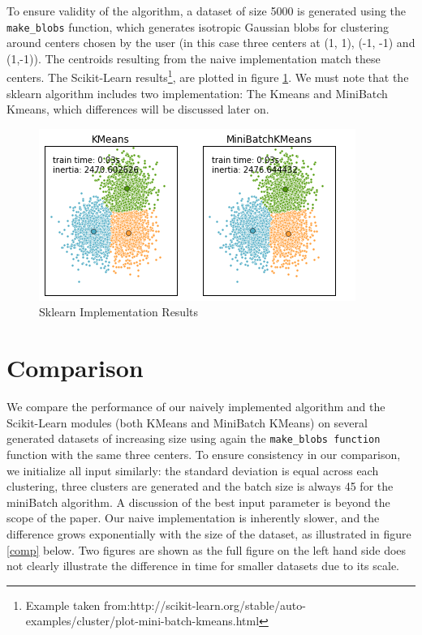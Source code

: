 \documentclass[11pt]{article}
\begin{document}
\noindent To ensure validity of the algorithm, a dataset of size 5000 is generated using the \verb|make_blobs| function, which generates isotropic Gaussian blobs for clustering around centers chosen by the user (in this case three centers at (1, 1), (-1, -1) and (1,-1)). The centroids resulting from the naive implementation match these centers.
The Scikit-Learn results\footnote{Example taken from:http://scikit-learn.org/stable/auto-examples/cluster/plot-mini-batch-kmeans.html}, are plotted in figure \ref{results}. We must note that the sklearn algorithm includes two implementation: The Kmeans and MiniBatch Kmeans, which differences will be discussed later on.

	\begin{figure}[ht!] 
		\centering
		\includegraphics[scale=0.8]{Figures/kmeans.png}
		\caption{Sklearn Implementation Results}
		\label{results}
	\end{figure}

\section*{Comparison}

We compare the performance of our naively implemented algorithm and the Scikit-Learn modules (both KMeans and MiniBatch KMeans) on several generated datasets of increasing size using again the \verb|make_blobs function| function with the same three centers. To ensure consistency in our comparison, we initialize all input similarly: the standard deviation is equal across each clustering, three clusters are generated and the batch size is always 45 for the miniBatch algorithm. A discussion of the best input parameter is  beyond the scope of the paper.  Our naive implementation is inherently slower, and the difference grows exponentially with the size of the dataset,  as illustrated in figure \ref{comp} below. Two figures are shown as the full figure on the left hand side does not clearly illustrate the difference in time for smaller datasets due to its scale.
\end{document}
